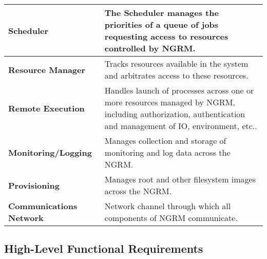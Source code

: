 \begin{tabular}{|p{4cm}|p{12cm}|}\hline
  \textbf{Scheduler} & The Scheduler manages the priorities of a queue
	of jobs requesting access to resources controlled by NGRM.\\
  \hline
  \textbf{Resource Manager} & Tracks resources available in the system and
	arbitrates access to these resources.\\
  \hline
  \textbf{Remote Execution} & Handles launch of processes across one or
	more resources managed by NGRM, including authorization,
	authentication and management of IO, environment, etc..\\
  \hline
  \textbf{Monitoring/Logging} & Manages collection and storage of monitoring
	and log data across the NGRM.\\
  \hline
  \textbf{Provisioning} & Manages root and other filesystem images across
	the NGRM.\\
  \hline
  \textbf{Communications Network} & Network channel through which all
	components of NGRM communicate.\\
  \hline
\end{tabular}

\subsection{High-Level Functional Requirements}\label{ReqsHiLevFun}

